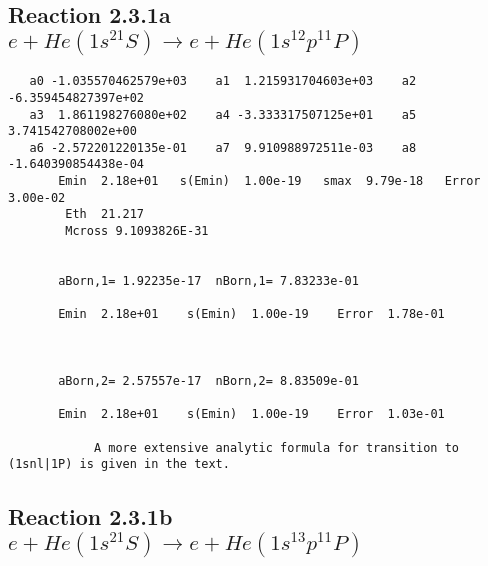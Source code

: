 \documentclass[12pt,dvipdfm]{article}
\begin{document}
\newpage
\subsection{
Reaction 2.3.1a $e + He(1s^21S) \rightarrow e + He(1s^12p^11P)$}






%










\begin{small}\begin{verbatim}
   a0 -1.035570462579e+03    a1  1.215931704603e+03    a2 -6.359454827397e+02
   a3  1.861198276080e+02    a4 -3.333317507125e+01    a5  3.741542708002e+00
   a6 -2.572201220135e-01    a7  9.910988972511e-03    a8 -1.640390854438e-04
       Emin  2.18e+01   s(Emin)  1.00e-19   smax  9.79e-18   Error  3.00e-02
        Eth  21.217
        Mcross 9.1093826E-31


       aBorn,1= 1.92235e-17  nBorn,1= 7.83233e-01

       Emin  2.18e+01    s(Emin)  1.00e-19    Error  1.78e-01



       aBorn,2= 2.57557e-17  nBorn,2= 8.83509e-01

       Emin  2.18e+01    s(Emin)  1.00e-19    Error  1.03e-01

            A more extensive analytic formula for transition to (1snl|1P) is given in the text.
\end{verbatim}\end{small}




\newpage
\subsection{
Reaction 2.3.1b $e + He(1s^21S) \rightarrow e + He(1s^13p^11P)$}






\end{document}
